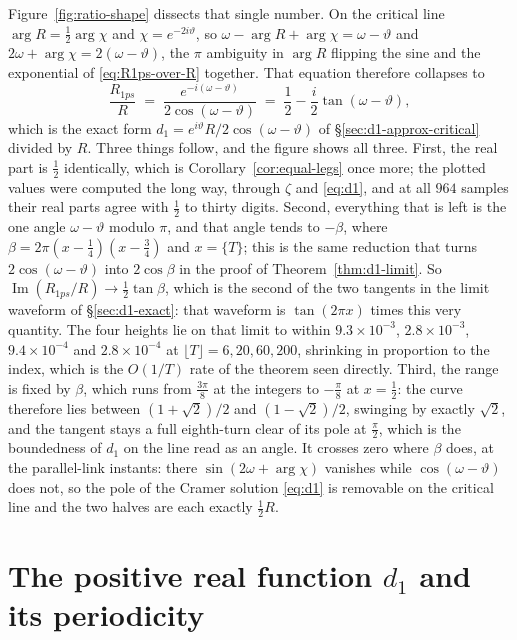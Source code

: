 \documentclass[11pt]{article}
\theoremstyle{definition}
\begin{document}
Figure~\ref{fig:ratio-shape} dissects that single number. On the critical
line $\arg R=\tfrac12\arg\chi$ and $\chi=e^{-2i\vartheta}$, so
$\omega-\arg R+\arg\chi=\omega-\vartheta$ and
$2\omega+\arg\chi=2(\omega-\vartheta)$, the $\pi$ ambiguity in $\arg R$
flipping the sine and the exponential of \eqref{eq:R1ps-over-R} together.
That equation therefore collapses to
\begin{equation}\label{eq:ratio-tangent}
\frac{R_{1ps}}{R}
\;=\;
\frac{e^{-i(\omega-\vartheta)}}{2\cos(\omega-\vartheta)}
\;=\;
\frac12-\frac{i}{2}\tan(\omega-\vartheta),
\end{equation}
which is the exact form $d_1=e^{i\vartheta}R/2\cos(\omega-\vartheta)$ of
\S\ref{sec:d1-approx-critical} divided by $R$. Three things follow, and the
figure shows all three. First, the real part is $\tfrac12$ identically,
which is Corollary~\ref{cor:equal-legs} once more; the plotted values were
computed the long way, through $\zeta$ and \eqref{eq:d1}, and at all $964$
samples their real parts agree with $\tfrac12$ to thirty digits. Second,
everything that is left is the one angle $\omega-\vartheta$ modulo $\pi$,
and that angle tends to $-\beta$, where
$\beta=2\pi(x-\tfrac14)(x-\tfrac34)$ and $x=\{T\}$; this is the same
reduction that turns $2\cos(\omega-\vartheta)$ into $2\cos\beta$ in the
proof of Theorem~\ref{thm:d1-limit}. So
$\operatorname{Im}(R_{1ps}/R)\to\tfrac12\tan\beta$, which is the second of
the two tangents in the limit waveform of \S\ref{sec:d1-exact}: that waveform
is $\tan(2\pi x)$ times this very quantity. The four
heights lie on that limit to within $9.3\times10^{-3}$,
$2.8\times10^{-3}$, $9.4\times10^{-4}$ and $2.8\times10^{-4}$ at
$\lfloor T\rfloor=6,20,60,200$, shrinking in proportion to the index, which
is the $O(1/T)$ rate of the theorem seen directly. Third, the range is
fixed by $\beta$, which runs from $\tfrac{3\pi}{8}$ at the integers to
$-\tfrac{\pi}{8}$ at $x=\tfrac12$: the curve therefore lies between
$(1+\sqrt2)/2$ and $(1-\sqrt2)/2$, swinging by exactly $\sqrt2$, and the
tangent stays a full eighth-turn clear of its pole at $\tfrac{\pi}{2}$,
which is the boundedness of $d_1$ on the line read as an angle. It crosses
zero where $\beta$ does, at the parallel-link instants: there
$\sin(2\omega+\arg\chi)$ vanishes while $\cos(\omega-\vartheta)$ does not,
so the pole of the Cramer solution \eqref{eq:d1} is removable on the
critical line and the two halves are each exactly $\tfrac12R$.

\section{The positive real function \texorpdfstring{$d_1$}{d1} and its periodicity}\label{sec:d1-function}
\end{document}
